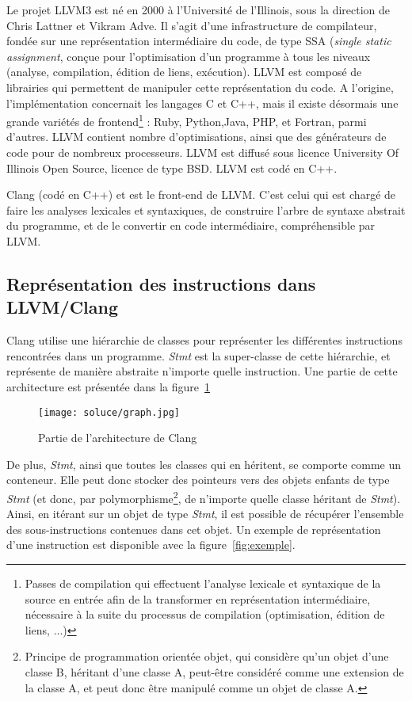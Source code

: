 \documentclass[11pt]{article}
\begin{document}
    Le projet LLVM3 est né en 2000 à l’Université de l’Illinois, sous la direction
    de Chris Lattner et Vikram Adve. Il s’agit d’une infrastructure de compilateur,
    fondée sur une représentation intermédiaire du code, de type
    SSA (\emph{single static assignment},
    conçue pour l’optimisation d’un programme à tous les niveaux
    (analyse, compilation,
    édition de liens, exécution). LLVM est composé de librairies qui permettent
    de manipuler cette représentation du code. A l’origine, l’implémentation concernait les
    langages C et C++, mais il existe désormais une grande variétés de frontend\footnote{Passes de compilation qui effectuent l’analyse lexicale et syntaxique de la source
    en entrée afin de la transformer en représentation intermédiaire, nécessaire à la suite du
    processus de compilation (optimisation, édition de liens, ...)} 
    : Ruby, Python,Java, PHP, et Fortran, parmi d’autres.
    LLVM contient nombre d’optimisations, ainsi que des générateurs de code
    pour de nombreux processeurs. LLVM est diffusé sous licence University Of
    Illinois Open Source, licence de type BSD. LLVM est codé en C++.

    Clang (codé en C++) et est le front-end de LLVM. C’est celui qui
    est chargé de faire les analyses lexicales et syntaxiques, de construire l’arbre
    de syntaxe abstrait du programme, et de le convertir en code intermédiaire,
    compréhensible par LLVM.
    
  \subsection{Représentation des instructions dans LLVM/Clang}

    Clang utilise une hiérarchie de classes pour représenter les différentes
    instructions rencontrées dans un programme. \emph{Stmt} est la super-classe de
    cette hiérarchie, et représente de manière abstraite n'importe quelle
    instruction. Une partie de cette architecture est présentée dans la
    figure~\ref{fig:graph}

    \begin{figure}[H]
      \centering
      \texttt{[image: soluce/graph.jpg]} 
      \caption{Partie de l'architecture de Clang}
      \label{fig:graph}
    \end{figure}

    \medskip
    De plus, \emph{Stmt}, ainsi que toutes les classes qui en héritent, se comporte
    comme un conteneur. Elle peut donc stocker des pointeurs vers des objets enfants
    de type \emph{Stmt} (et donc, par polymorphisme\footnote{Principe de
    programmation orientée objet, qui considère qu'un objet d'une classe B, héritant
    d'une classe A, peut-être considéré comme une extension de la classe A, et peut
    donc être manipulé comme un objet de classe A.}, de n'importe quelle classe
    héritant de \emph{Stmt}). Ainsi, en itérant sur un objet de type
    \emph{Stmt}, il est possible de récupérer l'ensemble des sous-instructions
    contenues dans cet objet. Un exemple de représentation d'une instruction est
    disponible avec la figure~\ref{fig:exemple}.
\end{document}
